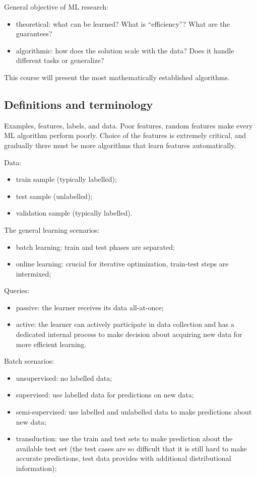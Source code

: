 \documentclass[a4paper]{article}
\begin{document}
General objective of ML research: \begin{itemize}
    \item theoretical: what can be learned? What is ``efficiency''? What are the
    guarantees?
    \item algorithmic: how does the solution scale with the data? Does it handle
    different tasks or generalize?
\end{itemize}

This course will present the most mathematically established algorithms.


\subsection{Definitions and terminology} %
\label{sub:definitions_and_terminology}

Examples, features, labels, and data. Poor features, random features make every
ML algorithm perform poorly. Choice of the features is extremely critical, and
gradually there must be more algorithms that learn features automatically.

Data: \begin{itemize}
    \item train sample (typically labelled);
    \item test sample (unlabelled);
    \item validation sample (typically labelled).
\end{itemize}

The general learning scenarios: \begin{itemize}
    \item batch learning: train and test phases are separated;
    \item online learning: crucial for iterative optimization, train-test steps
    are intermixed;
\end{itemize}

Queries: \begin{itemize}
    \item passive: the learner receives its data all-at-once;
    \item active: the learner can actively participate in data collection and has
    a dedicated internal process to make decision about acquiring new data for more
    efficient learning.
\end{itemize}

Batch scenarios: \begin{itemize}
    \item unsupervised: no labelled data;
    \item supervised: use labelled data for predictions on new data;
    \item semi-supervised: use labelled and unlabelled data to make predictions
    about new data;
    \item transduction: use the train and test sets to make prediction about the
    available test set (the test cases are so difficult that it is still hard to
    make accurate predictions, test data provides with additional distributional
    information);
\end{itemize}
\end{document}
